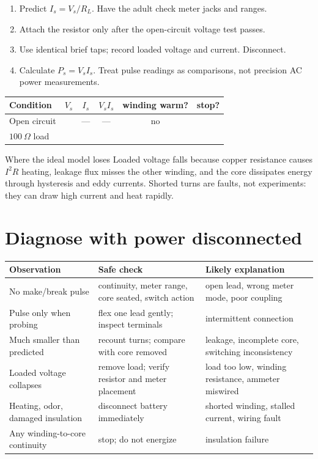 \begin{enumerate}
\item Predict \(I_s=V_s/R_L\). Have the adult check meter jacks and ranges.
\item Attach the resistor only after the open-circuit voltage test passes.
\item Use identical brief taps; record loaded voltage and current. Disconnect.
\item Calculate \(P_s=V_sI_s\). Treat pulse readings as comparisons, not
precision AC power measurements.
\end{enumerate}

\begin{center}\small
\begin{tabularx}{\linewidth}{@{}lCCCCC@{}}
\toprule
Condition & \(V_s\) & \(I_s\) & \(V_sI_s\) & winding warm? & stop?\\
\midrule
Open circuit & & --- & --- & no & \\
\(\qty{100}{\Omega}\) load & & & & &\\
\bottomrule
\end{tabularx}
\end{center}

\begin{teloscard}{Where the ideal model loses}
Loaded voltage falls because copper resistance causes \(I^2R\) heating,
leakage flux misses the other winding, and the core dissipates energy through
hysteresis and eddy currents. Shorted turns are faults, not experiments: they
can draw high current and heat rapidly.
\end{teloscard}

\newpage
{}
\footnotesize
\section{Diagnose with power disconnected}
\begin{center}\small
\begin{tabularx}{\linewidth}{@{}p{.23\linewidth}p{.26\linewidth}L@{}}
\toprule
Observation & Safe check & Likely explanation\\
\midrule
No make/break pulse & continuity, meter range, core seated, switch action &
open lead, wrong meter mode, poor coupling\\
Pulse only when probing & flex one lead gently; inspect terminals &
intermittent connection\\
Much smaller than predicted & recount turns; compare with core removed &
leakage, incomplete core, switching inconsistency\\
Loaded voltage collapses & remove load; verify resistor and meter placement &
load too low, winding resistance, ammeter miswired\\
Heating, odor, damaged insulation & disconnect battery immediately &
shorted winding, stalled current, wiring fault\\
Any winding-to-core continuity & stop; do not energize &
insulation failure\\
\bottomrule
\end{tabularx}
\end{center}

